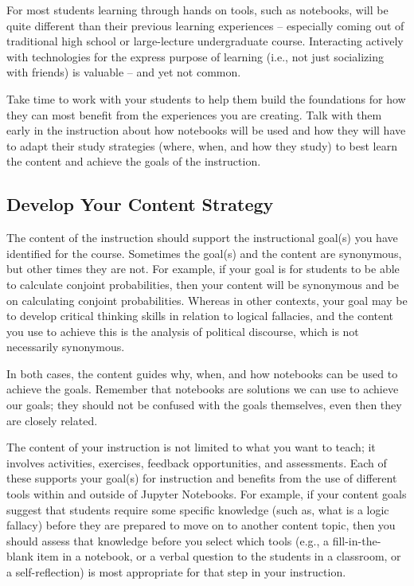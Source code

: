 \documentclass[]{book}
\begin{document}
For most students learning through hands on tools, such as notebooks,
will be quite different than their previous learning experiences --
especially coming out of traditional high school or large-lecture
undergraduate course. Interacting actively with technologies for the
express purpose of learning (i.e., not just socializing with friends) is
valuable -- and yet not common.

Take time to work with your students to help them build the foundations
for how they can most benefit from the experiences you are creating.
Talk with them early in the instruction about how notebooks will be used
and how they will have to adapt their study strategies (where, when, and
how they study) to best learn the content and achieve the goals of the
instruction.

\subsection{Develop Your Content
Strategy}\label{develop-your-content-strategy}

The content of the instruction should support the instructional goal(s)
you have identified for the course. Sometimes the goal(s) and the
content are synonymous, but other times they are not. For example, if
your goal is for students to be able to calculate conjoint
probabilities, then your content will be synonymous and be on
calculating conjoint probabilities. Whereas in other contexts, your goal
may be to develop critical thinking skills in relation to logical
fallacies, and the content you use to achieve this is the analysis of
political discourse, which is not necessarily synonymous.

In both cases, the content guides why, when, and how notebooks can be
used to achieve the goals. Remember that notebooks are solutions we can
use to achieve our goals; they should not be confused with the goals
themselves, even then they are closely related.

The content of your instruction is not limited to what you want to
teach; it involves activities, exercises, feedback opportunities, and
assessments. Each of these supports your goal(s) for instruction and
benefits from the use of different tools within and outside of Jupyter
Notebooks. For example, if your content goals suggest that students
require some specific knowledge (such as, what is a logic fallacy)
before they are prepared to move on to another content topic, then you
should assess that knowledge before you select which tools (e.g., a
fill-in-the-blank item in a notebook, or a verbal question to the
students in a classroom, or a self-reflection) is most appropriate for
that step in your instruction.
\end{document}
